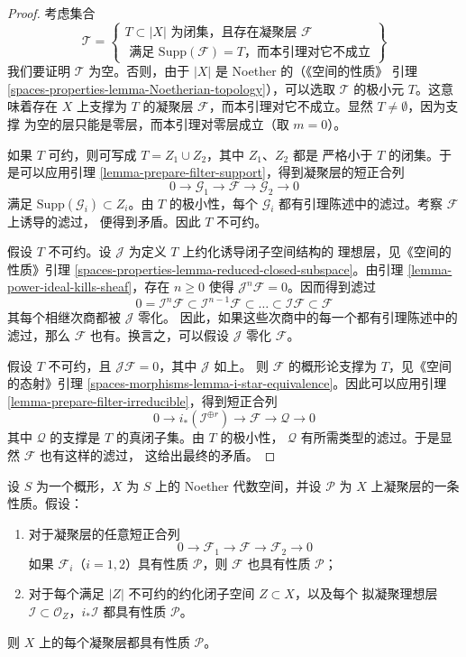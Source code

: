 \begin{proof}
考虑集合
$$
\mathcal{T} =
\left\{
\begin{matrix}
T \subset |X|
\text{ 为闭集，且存在凝聚层 }
\mathcal{F} \\
\text{ 满足 }
\text{Supp}(\mathcal{F}) = T
\text{，而本引理对它不成立}
\end{matrix}
\right\}
$$
我们要证明 $\mathcal{T}$ 为空。否则，由于 $|X|$ 是 Noether 的（《空间的性质》
引理 \ref{spaces-properties-lemma-Noetherian-topology}），可以选取
$\mathcal{T}$ 的极小元 $T$。这意味着存在 $X$ 上支撑为 $T$ 的凝聚层
$\mathcal{F}$，而本引理对它不成立。显然 $T \not = \emptyset$，因为支撑
为空的层只能是零层，而本引理对零层成立（取 $m = 0$）。

\medskip\noindent
如果 $T$ 可约，则可写成 $T = Z_1 \cup Z_2$，其中 $Z_1$、$Z_2$ 都是
严格小于 $T$ 的闭集。于是可以应用引理
\ref{lemma-prepare-filter-support}，得到凝聚层的短正合列
$$
0 \to
\mathcal{G}_1 \to
\mathcal{F} \to
\mathcal{G}_2 \to 0
$$
满足 $\text{Supp}(\mathcal{G}_i) \subset Z_i$。由 $T$ 的极小性，每个
$\mathcal{G}_i$ 都有引理陈述中的滤过。考察 $\mathcal{F}$ 上诱导的滤过，
便得到矛盾。因此 $T$ 不可约。

\medskip\noindent
假设 $T$ 不可约。设 $\mathcal{J}$ 为定义 $T$ 上约化诱导闭子空间结构的
理想层，见《空间的性质》引理
\ref{spaces-properties-lemma-reduced-closed-subspace}。由引理
\ref{lemma-power-ideal-kills-sheaf}，存在 $n \geq 0$ 使得
$\mathcal{J}^n\mathcal{F} = 0$。因而得到滤过
$$
0 = \mathcal{I}^n\mathcal{F} \subset \mathcal{I}^{n - 1}\mathcal{F}
\subset \ldots \subset \mathcal{I}\mathcal{F} \subset \mathcal{F}
$$
其每个相继次商都被 $\mathcal{J}$ 零化。%
因此，如果这些次商中的每一个都有引理陈述中的滤过，那么
$\mathcal{F}$ 也有。换言之，可以假设 $\mathcal{J}$ 零化 $\mathcal{F}$。

\medskip\noindent
假设 $T$ 不可约，且 $\mathcal{J}\mathcal{F} = 0$，其中 $\mathcal{J}$ 如上。
则 $\mathcal{F}$ 的概形论支撑为 $T$，见《空间的态射》引理
\ref{spaces-morphisms-lemma-i-star-equivalence}。因此可以应用引理
\ref{lemma-prepare-filter-irreducible}，得到短正合列
$$
0 \to
i_*(\mathcal{I}^{\oplus r}) \to
\mathcal{F} \to
\mathcal{Q} \to 0
$$
其中 $\mathcal{Q}$ 的支撑是 $T$ 的真闭子集。由 $T$ 的极小性，
$\mathcal{Q}$ 有所需类型的滤过。于是显然 $\mathcal{F}$ 也有这样的滤过，
这给出最终的矛盾。
\end{proof}

\begin{lemma}
\label{lemma-property-initial}
设 $S$ 为一个概形，$X$ 为 $S$ 上的 Noether 代数空间，并设
$\mathcal{P}$ 为 $X$ 上凝聚层的一条性质。假设：
\begin{enumerate}
\item 对于凝聚层的任意短正合列
$$
0 \to \mathcal{F}_1 \to \mathcal{F} \to \mathcal{F}_2 \to 0
$$
如果 $\mathcal{F}_i$（$i = 1, 2$）具有性质 $\mathcal{P}$，则
$\mathcal{F}$ 也具有性质 $\mathcal{P}$；
\item 对于每个满足 $|Z|$ 不可约的约化闭子空间 $Z \subset X$，以及每个
拟凝聚理想层 $\mathcal{I} \subset \mathcal{O}_Z$，$i_*\mathcal{I}$
都具有性质 $\mathcal{P}$。
\end{enumerate}
则 $X$ 上的每个凝聚层都具有性质 $\mathcal{P}$。
\end{lemma}

